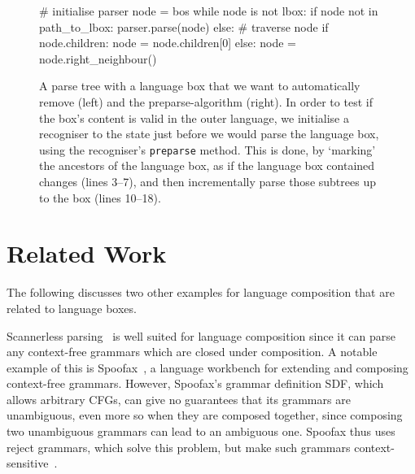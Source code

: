 \documentclass[sigplan,screen]{acmart}\settopmatter{printfolios=true,printccs=false,printacmref=false}
\begin{document}
\begin{figure}
\begin{minipage}{0.5\textwidth}
\begin{lstdefault}[basicstyle=\linespread{1.0}\footnotesize\ttfamily]
  # initialise parser
  node = bos
  while node is not lbox:
    if node not in path_to_lbox:
      parser.parse(node)
    else: # traverse node
      if node.children:
        node = node.children[0]
      else:
        node = node.right_neighbour()
\end{lstdefault}
\end{minipage}
\caption{A parse tree with a language box that we want to automatically remove (left)
and the preparse-algorithm (right). In
order to test if the box's content is valid in the outer language, we
initialise a recogniser to the state just before we would parse the language box,
using the recogniser's \texttt{preparse} method. This is done,
by `marking' the ancestors of the language box, as if the language box
contained changes (lines 3--7), and then incrementally parse those subtrees
up to the box (lines 10--18).}
\label{fig_preparse}
\end{figure}

\section{Related Work}
\label{autobox_related_work}

The following discusses two other examples for language composition that are
related to language boxes.

Scannerless parsing~\cite{visser97scannerless, vandenbrand02disambiguation} is well
suited for language composition since it can parse any context-free grammars
which are closed under composition. A notable example of this is
Spoofax~\cite{kats10spoofax}, a language workbench for extending and composing
context-free grammars. However, Spoofax's grammar definition SDF, which allows
arbitrary CFGs, can give no guarantees that its grammars are unambiguous, even
more so when they are composed together, since composing two unambiguous
grammars can lead to an ambiguous one.  Spoofax thus uses reject grammars,
which solve this problem, but make such grammars
context-sensitive~\cite{eijck__lets_accept_rejects}.
\end{document}
